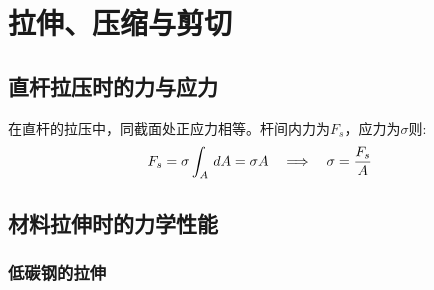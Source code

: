 \chapter{拉伸、压缩与剪切}


\section{直杆拉压时的力与应力}

{\noindent 在直杆的拉压中，同截面处正应力相等。杆间内力为$F_s$，应力为$\sigma$则:}
\begin{equation}\label{eq:straightBar}
    {F_s=\sigma\int_{A}\,dA = \sigma A}\quad\Longrightarrow\quad
    \sigma = {F_s\over A}
\end{equation}

\section{材料拉伸时的力学性能}

\subsection{低碳钢的拉伸}

